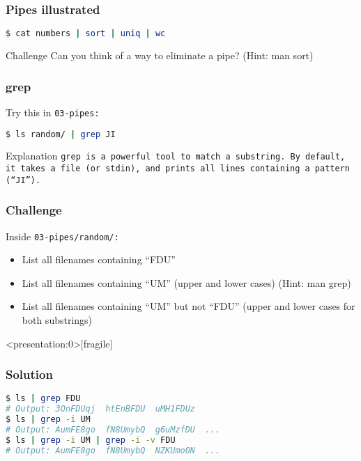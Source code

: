 \begin{frame}[fragile]
\frametitle{Pipes illustrated}
\begin{lstlisting}[language=bash]
$ cat numbers | sort | uniq | wc
\end{lstlisting}
\begin{figure}
    \centering
\end{figure}
\begin{block}{Challenge}
    Can you think of a way to eliminate a pipe? (Hint: man sort)
\end{block}
\end{frame}

\begin{frame}[fragile]
\frametitle{grep}
Try this in \tt{03-pipes}:
\begin{lstlisting}[language=bash]
$ ls random/ | grep JI
\end{lstlisting}
\pause
\begin{block}{Explanation}
    \tt{grep} is a powerful tool to match a substring. By default, it takes
    a file (or stdin), and prints all lines containing a pattern (``JI'').
\end{block}
\end{frame}

\begin{frame}
\frametitle{Challenge}
Inside \tt{03-pipes/random/}:
\begin{itemize}
    \item List all filenames containing ``FDU''
    \item List all filenames containing ``UM'' (upper and lower cases)
        (Hint: man grep)
    \item List all filenames containing ``UM'' but not ``FDU''
        (upper and lower cases for both substrings)
\end{itemize}
\end{frame}

\begin{frame}<presentation:0>[fragile]
\frametitle{Solution}
\begin{lstlisting}[language=bash]
$ ls | grep FDU
# Output: 3OnFDUqj  htEnBFDU  uMH1FDUz
$ ls | grep -i UM
# Output: AumFE8go  fN8UmybQ  g6uMzfDU  ...
$ ls | grep -i UM | grep -i -v FDU
# Output: AumFE8go  fN8UmybQ  NZKUmo0N  ...
\end{lstlisting}
\end{frame}
